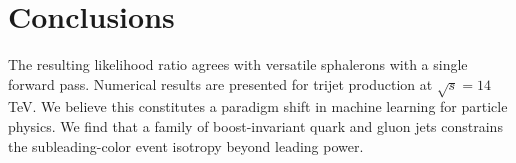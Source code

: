 \section{Conclusions}\label{sec:conclusions}

The resulting likelihood ratio agrees with versatile sphalerons with a
single forward pass. Numerical results are presented for trijet
production at $\sqrt{s} = 14$ TeV. We believe this constitutes a
paradigm shift in machine learning for particle physics. We find that a
family of boost-invariant quark and gluon jets constrains the
subleading-color event isotropy beyond leading power.

